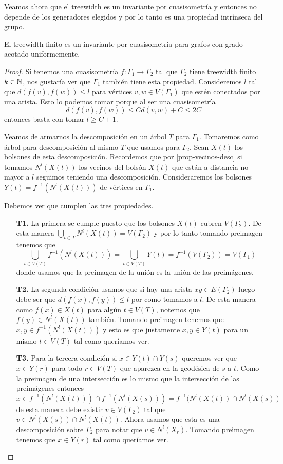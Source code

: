 \documentclass[tesis.tex]{subfiles}
\begin{document}
Veamos ahora que el treewidth es un invariante por cuasisometría y entonces no depende de los generadores elegidos y por lo tanto es una propiedad intrínseca del grupo. 

\begin{prop} \label{treewidth-inv}
	El treewidth finito es un invariante por cuasisometría para grafos con grado acotado uniformemente.
\end{prop}

\begin{proof}
	Si tenemos una cuasisometría $f:\Gamma_1 \to \Gamma_2$ tal que $\Gamma_2$ tiene treewidth finito $k \in \mathbb{N}$, nos gustaría ver que $\Gamma_1$ también tiene esta propiedad.
	Consideremos $l$ tal que $d(f(v),f(w)) \le l$ para vértices $v,w \in V(\Gamma_1)$ que estén conectados por una arista.
	Esto lo podemos tomar porque al ser una cuasisometría 
	\[
	d(f(v),f(w)) \le C d(v,w) + C  \le 2C
	\]
	entonces basta con tomar $l \ge C+1$.
	
	Veamos de armarnos la descomposición en un árbol $T$ para $\Gamma_1$.	
	Tomaremos como árbol para descomposición al mismo $T$ que usamos para $\Gamma_2$.
	Sean $X(t)$ los bolsones de esta descomposición. 
	Recordemos que por \ref{prop-vecinos-desc} si tomamos $N^l(X(t))$ los vecinos del bolsón $X(t)$ que están a distancia no mayor a $l$ seguimos teniendo una descomposición.  
	Consideraremos los bolsones $Y(t) = f^{-1}(N^l(X(t)))$ de vértices en $\Gamma_1$. 
	
	Debemos ver que cumplen las tres propiedades.
	
	\begin{enumerate}
		\item[\textbf{T1.}] La primera se cumple puesto que los bolsones $X(t)$ cubren $V(\Gamma_2)$. 
		De esta manera $\bigcup_{t \in T} N^l(X(t)) = V(\Gamma_2)$ y por lo tanto tomando preimagen tenemos que
		\[
		\bigcup_{t \in V(T)} f^{-1} (N^l (X(t))) = \bigcup_{t \in V(T)} Y(t) = f^{-1} (V(\Gamma_2)) = V(\Gamma_1)
		\] 
		donde usamos que la preimagen de la unión es la unión de las preimágenes.
		\item[\textbf{T2.}] La segunda condición usamos que si hay una arista $xy \in E(\Gamma_2)$ luego debe ser que $d(f(x),f(y)) \le l$ por como tomamos a $l$.
		De esta manera como $f(x) \in X(t)$ para algún $t \in V(T)$, notemos que $f(y) \in N^l(X(t))$ también. 
		Tomando preimagen tenemos que $x,y \in f^{-1}(N^l(X(t)))$ y esto es que justamente $x,y \in Y(t)$ para un mismo $t \in V(T)$ tal como queríamos ver.		
		\item[\textbf{T3.}] Para la tercera condición si $x \in Y(t) \cap Y(s)$ queremos ver que $x \in Y(r)$ para todo $r \in V(T)$ que aparezca en la geodésica de $s$ a $t$.
		Como la preimagen de una intersección es lo mismo que la intersección de las preimágenes entonces 
		\[
		x \in f^{-1}(N^l(X(t))) \cap f^{-1}(N^l(X(s))) = f^{-1}(N^l(X(t)) \cap N^l (X(s))
		\]
		de esta manera debe existir $v \in V(\Gamma_2)$ tal que $v \in N^l(X(s)) \cap N^l(X(t))$.
		Ahora usamos que esta es una descomposición sobre $\Gamma_2$ para notar que $v \in N^l(X_r)$.
		Tomando preimagen tenemos que $x \in Y(r)$ tal como queríamos ver.
	\end{enumerate}
	

\end{proof}
\end{document}
